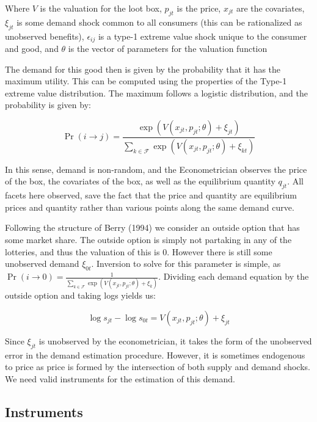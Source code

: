 \documentclass[12pt]{paper}
\begin{document}
Where $V$ is the valuation for the loot box, $p_{jt}$ is the price,
$x_{jt}$ are the covariates, $\xi_{jt}$ is some demand shock common to
all consumers (this can be rationalized as unobserved benefits), 
$\epsilon_{ij}$ is a type-1 extreme value shock unique to the consumer and
good, and $\theta$ is the vector of parameters for the valuation function

The demand for this good then is given by the probability that it has
the maximum utility. This can be computed using the properties of the
Type-1 extreme value distribution. The maximum follows a logistic
distribution, and the probability is given by:

\begin{equation*}
  \Pr( i \rightarrow j ) = \frac{\exp( V(x_{jt},p_{jt} ; \theta) + \xi_{jt})}{ \sum_{k \in \mathcal{F}}
    \exp(V(x_{jt},p_{jt}; \theta) + \xi_{kt})}
\end{equation*}

In this sense, demand is non-random, and the Econometrician observes
the price of the box, the covariates of the box, as well as the
equilibrium quantity $q_{jt}$. All facets here observed, save the fact
that the price and quantity are equilibrium prices and quantity rather
than various points along the same demand curve.

Following the structure of Berry (1994) we consider an outside option
that has some market share. The outside option is simply not partaking
in any of the lotteries, and thus the valuation of this is $0$.
However there is still some unobserved demand $\xi_{0t}$. Inversion to
solve for this parameter is simple, as
$\Pr( i \rightarrow 0) = \frac{1}{ \sum_{k \in \mathcal{F}} \exp(V(x_{jt},p_{jt}; \theta) +
  \xi_k)}$.  Dividing each demand equation by the outside option and
taking logs yields us:

\begin{equation*}
  \log s_{jt} - \log s_{0t} = V(x_{jt}, p_{jt}; \theta) + \xi_{jt}
\end{equation*}

Since $\xi_{jt}$ is unobserved by the econometrician, it takes the form
of the unobserved error in the demand estimation procedure. However,
it is sometimes endogenous to price as price is formed by the
intersection of both supply and demand shocks. We need valid
instruments for the estimation of this demand.

\subsection{Instruments}
\end{document}
